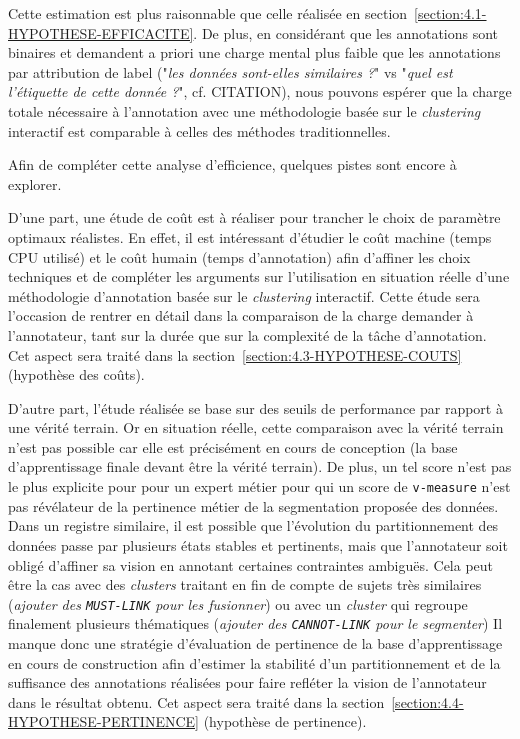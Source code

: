 			Cette estimation est plus raisonnable que celle réalisée en section~\ref{section:4.1-HYPOTHESE-EFFICACITE}.
			De plus, en considérant que les annotations sont binaires et demandent a priori une charge mental plus faible que les annotations par attribution de label ("\textit{les données sont-elles similaires ?}" vs "\textit{quel est l'étiquette de cette donnée ?}", cf. CITATION), nous pouvons espérer que la charge totale nécessaire à l'annotation avec une méthodologie basée sur le \textit{clustering} interactif est comparable à celles des méthodes traditionnelles.
			
			Afin de compléter cette analyse d'efficience, quelques pistes sont encore à explorer.
			
			D'une part, une étude de coût est à réaliser pour trancher le choix de paramètre optimaux réalistes.
			En effet, il est intéressant d'étudier le coût machine (temps CPU utilisé) et le coût humain (temps d'annotation) afin d'affiner les choix techniques et de compléter les arguments sur l'utilisation en situation réelle d'une méthodologie d'annotation basée sur le \textit{clustering} interactif.
			Cette étude sera l'occasion de rentrer en détail dans la comparaison de la charge demander à l'annotateur, tant sur la durée que sur la complexité de la tâche d'annotation.
			Cet aspect sera traité dans la section~\ref{section:4.3-HYPOTHESE-COUTS} (hypothèse des coûts).
			
			D'autre part, l'étude réalisée se base sur des seuils de performance par rapport à une vérité terrain.
			Or en situation réelle, cette comparaison avec la vérité terrain n'est pas possible car elle est précisément en cours de conception (la base d'apprentissage finale devant être la vérité terrain).
			De plus, un tel score n'est pas le plus explicite pour pour un expert métier pour qui un score de \texttt{v-measure} n'est pas révélateur de la pertinence métier de la segmentation proposée des données.
			Dans un registre similaire, il est possible que l'évolution du partitionnement des données passe par plusieurs états stables et pertinents, mais que l'annotateur soit obligé d'affiner sa vision en annotant certaines contraintes ambiguës.
			Cela peut être la cas avec des \textit{clusters} traitant en fin de compte de sujets très similaires (\textit{ajouter des \texttt{MUST-LINK} pour les fusionner}) ou avec un \textit{cluster} qui regroupe finalement plusieurs thématiques (\textit{ajouter des \texttt{CANNOT-LINK} pour le segmenter})
			Il manque donc une stratégie d'évaluation de pertinence de la base d'apprentissage en cours de construction afin d'estimer la stabilité d'un partitionnement et de la suffisance des annotations réalisées pour faire refléter la vision de l'annotateur dans le résultat obtenu.
			Cet aspect sera traité dans la section~\ref{section:4.4-HYPOTHESE-PERTINENCE} (hypothèse de pertinence).
			
